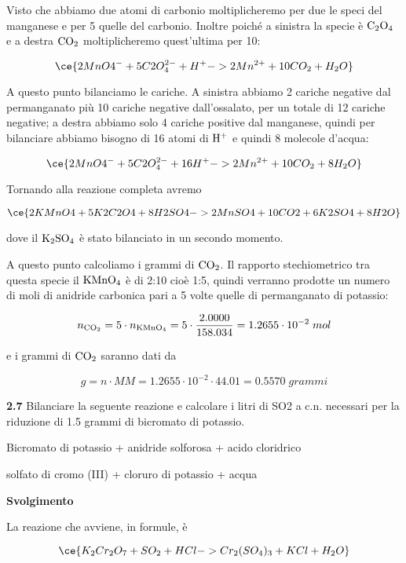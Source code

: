 Visto che abbiamo due atomi di carbonio moltiplicheremo per due le speci del manganese e per 5 quelle del carbonio. Inoltre poiché a sinistra la specie è $\rm C_2O_4$ e a destra $\rm CO_2$ moltiplicheremo quest'ultima per 10:

$$\ce{2MnO4^- + 5C2O_4^{2-} + H^+ -> 2Mn^{2+} + 10CO_2 + H_2O}$$

A questo punto bilanciamo le cariche. A sinistra abbiamo 2 cariche negative dal permanganato più 10 cariche negative dall'ossalato, per un totale di 12 cariche negative; a destra abbiamo solo 4 cariche positive dal manganese, quindi per bilanciare abbiamo bisogno di 16 atomi di $\rm H^+$ e quindi 8 molecole d'acqua:

$$\ce{2MnO4^- + 5C2O_4^{2-} + 16H^+ -> 2Mn^{2+} + 10CO_2 + 8H_2O}$$

Tornando alla reazione completa avremo

$$\ce{2KMnO4 + 5K2C2O4 + 8H2SO4 -> 2MnSO4 + 10CO2 + 6K2SO4 + 8H2O}$$

dove il $\rm K_2SO_4$ è stato bilanciato in un secondo momento.

A questo punto calcoliamo i grammi di $\rm CO_2$. Il rapporto stechiometrico tra questa specie il $\rm KMnO_4$ è di 2:10 cioè 1:5, quindi verranno prodotte un numero di moli di anidride carbonica pari a 5 volte quelle di permanganato di potassio:

$$n_{\rm CO_2}=5 \cdot n_{\rm KMnO_4}
=5 \cdot \frac{2.0000}{158.034}
=1.2655 \cdot 10^{-2}\;mol$$

e i grammi di $\rm CO_2$ saranno dati da

$$g=n \cdot MM=1.2655 \cdot 10^{-2} \cdot 44.01
=0.5570\;grammi$$

\vspace{0.2cm}\textbf{2.7} Bilanciare la seguente reazione e calcolare i litri di SO2 a c.n. necessari per la riduzione di 1.5
grammi di bicromato di potassio.

\begin{center}
    Bicromato di potassio + anidride solforosa + acido cloridrico \ce{->}

    \ce{->} solfato di cromo (III) + cloruro di potassio + acqua
\end{center}

\large\textbf{Svolgimento}\normalsize

\vspace{0.2cm}La reazione che avviene, in formule, è

$$\ce{K_2Cr_2O_7 + SO_2 + HCl -> Cr_2(SO_4)_3 + KCl + H_2O}$$

